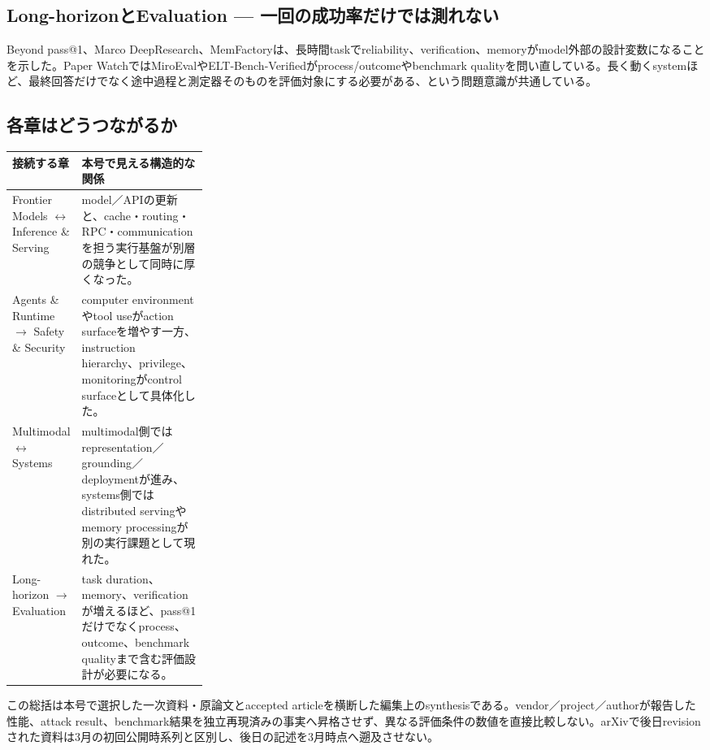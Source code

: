 \begin{multicols}{2}
\par\medskip{}
\subsection{Long-horizonとEvaluation — 一回の成功率だけでは測れない}
Beyond pass@1、Marco DeepResearch、MemFactoryは、長時間taskでreliability、verification、memoryがmodel外部の設計変数になることを示した。Paper WatchではMiroEvalやELT-Bench-Verifiedがprocess/outcomeやbenchmark qualityを問い直している。長く動くsystemほど、最終回答だけでなく途中過程と測定器そのものを評価対象にする必要がある、という問題意識が共通している。 \cite{src-0ec537ec1cc1,src-2b8b39e5cae3,src-42318ebdee75,src-5d84874f2d03,src-a27679e5527b}

\end{multicols}
\Needspace{0.34\textheight}
\subsection*{各章はどうつながるか}
\begin{center}
\small
\renewcommand{\arraystretch}{1.16}
\begin{tabularx}{\linewidth}{@{}p{0.28\linewidth}X@{}}
\toprule
接続する章 & 本号で見える構造的な関係 \\
\midrule
Frontier Models $\leftrightarrow$ Inference \& Serving & model／APIの更新と、cache・routing・RPC・communicationを担う実行基盤が別層の競争として同時に厚くなった。 \cite{src-eea6230f612a,src-7e670bf82538,src-d6cda62f02bb} \\
Agents \& Runtime $\rightarrow$ Safety \& Security & computer environmentやtool useがaction surfaceを増やす一方、instruction hierarchy、privilege、monitoringがcontrol surfaceとして具体化した。 \cite{src-01572b4c34e9,src-18b7ee4fe5e4,src-5becf449a527} \\
Multimodal $\leftrightarrow$ Systems & multimodal側ではrepresentation／grounding／deploymentが進み、systems側ではdistributed servingやmemory processingが別の実行課題として現れた。 \cite{src-ac36472a8f09,src-361b6111931d,src-b6e517afaa35} \\
Long-horizon $\rightarrow$ Evaluation & task duration、memory、verificationが増えるほど、pass@1だけでなくprocess、outcome、benchmark qualityまで含む評価設計が必要になる。 \cite{src-0ec537ec1cc1,src-5d84874f2d03,src-a27679e5527b} \\
\bottomrule
\end{tabularx}
\renewcommand{\arraystretch}{1.0}
\end{center}
\normalsize
\begin{claimboundary}[この総括の境界]
この総括は本号で選択した一次資料・原論文とaccepted articleを横断した編集上のsynthesisである。vendor／project／authorが報告した性能、attack result、benchmark結果を独立再現済みの事実へ昇格させず、異なる評価条件の数値を直接比較しない。arXivで後日revisionされた資料は3月の初回公開時系列と区別し、後日の記述を3月時点へ遡及させない。
\end{claimboundary}
